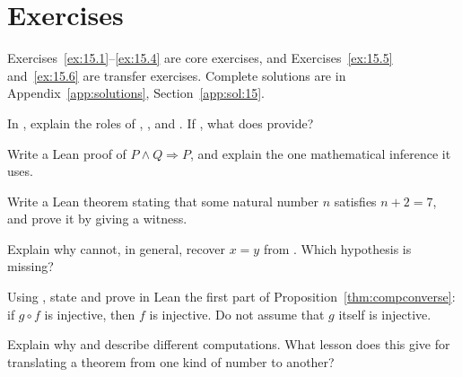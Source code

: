 \section*{Exercises}
Exercises~\ref{ex:15.1}--\ref{ex:15.4} are core exercises, and Exercises~\ref{ex:15.5} and~\ref{ex:15.6} are transfer exercises. Complete solutions are in Appendix~\ref{app:solutions}, Section~\ref{app:sol:15}.
\begin{exercise}\label{ex:15.1}In , explain the roles of , , and . If , what does  provide?\end{exercise}
\begin{exercise}\label{ex:15.2}Write a Lean proof of $P\land Q\Rightarrow P$, and explain the one mathematical inference it uses.\end{exercise}
\begin{exercise}\label{ex:15.3}Write a Lean theorem stating that some natural number $n$ satisfies $n+2=7$, and prove it by giving a witness.\end{exercise}
\begin{exercise}\label{ex:15.4}Explain why  cannot, in general, recover $x=y$ from . Which hypothesis is missing?\end{exercise}
\begin{exercise}\label{ex:15.5}Using , state and prove in Lean the first part of Proposition~\ref{thm:compconverse}: if $g\circ f$ is injective, then $f$ is injective. Do not assume that $g$ itself is injective.\end{exercise}
\begin{exercise}\label{ex:15.6}Explain why  and  describe different computations. What lesson does this give for translating a theorem from one kind of number to another?\end{exercise}
